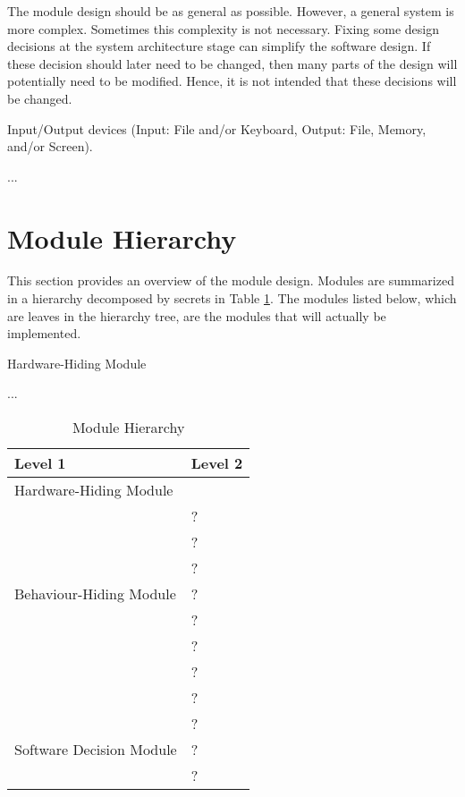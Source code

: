 \documentclass[12pt, titlepage]{article}
\newcounter{ucnum}
\newcommand{\uctheucnum}{UC\theucnum}
\newcounter{mnum}
\newcommand{\mthemnum}{M\themnum}
\begin{document}
The module design should be as general as possible. However, a general system is
more complex. Sometimes this complexity is not necessary. Fixing some design
decisions at the system architecture stage can simplify the software design. If
these decision should later need to be changed, then many parts of the design
will potentially need to be modified. Hence, it is not intended that these
decisions will be changed.

\begin{description}
\item[ \uctheucnum \label{ucIO}:] Input/Output devices
  (Input: File and/or Keyboard, Output: File, Memory, and/or Screen).
\item ...
\end{description}

\section{Module Hierarchy} \label{SecMH}

This section provides an overview of the module design. Modules are summarized
in a hierarchy decomposed by secrets in Table \ref{TblMH}. The modules listed
below, which are leaves in the hierarchy tree, are the modules that will
actually be implemented.

\begin{description}
\item [ \mthemnum \label{mHH}:] Hardware-Hiding Module
\item ...
\end{description}


\begin{table}[h!]
\centering
\begin{tabular}{p{} p{}}
\toprule
\textbf{Level 1} & \textbf{Level 2}\\
\midrule

{Hardware-Hiding Module} & ~ \\
\midrule

\multirow{7}{0.3\textwidth}{Behaviour-Hiding Module} & ?\\
& ?\\
& ?\\
& ?\\
& ?\\
& ?\\
& ?\\ 
& ?\\
\midrule

\multirow{3}{0.3\textwidth}{Software Decision Module} & {?}\\
& ?\\
& ?\\
\bottomrule

\end{tabular}
\caption{Module Hierarchy}
\label{TblMH}
\end{table}
\end{document}
